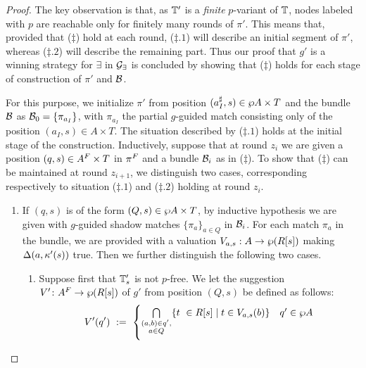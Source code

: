 \begin{proof}
The key observation is that, as $\mathbb{T}'$ is a \emph{finite} $p$-variant of $\mathbb{T}$, nodes labeled with $p$ are reachable only for finitely many rounds of $\pi'$. This means that, provided that ($\ddag$) hold at each round, ($\ddag.1$) will describe an initial segment of $\pi'$, whereas ($\ddag.2$) will describe the remaining part. Thus our proof that $g'$ is a winning strategy for $\exists$ in $\mathcal{G}_{\exists}$ is concluded by showing that ($\ddag$) holds for each stage of construction of $\pi'$ and $\mathcal{B}$.

For this purpose, we initialize $\pi'$ from position $(a_{I}^{\sharp},s) \in \wp A\times T$ and the bundle $\mathcal{B}$ as $\mathcal{B}_0 = \{\pi_{a_I}\}$, with $\pi_{a_I}$ the partial $g$-guided match consisting only of the position $(a_I,s)\in A\times T$. The situation described by ($\ddag .1$) holds at the initial stage of the construction.
Inductively, suppose that at round $z_i$ we are given a position $(q,s) \in A^{F} \times T$ in $\pi^{F}$ and a bundle $\mathcal{B}_i$ as in ($\ddag$). To show that ($\ddag$) can be maintained at round $z_{i+1}$, we distinguish two cases, corresponding respectively to situation ($\ddag.1$) and ($\ddag.2$) holding at round $z_i$.
\begin{enumerate}[label = (\Alph*), ref = \Alph*]
  \item If $(q,s)$ is of the form $(Q,s) \in \wp A \times T$, by inductive hypothesis we are given with $g$-guided shadow matches $\{\pi_a\}_{a \in Q}$ in $\mathcal{B}_i$. For each match $\pi_a$ in the bundle, we are provided with a valuation $V_{a,s}: A \rightarrow \wp (R[s])$ making $\Delta(a,\kappa'(s))$ true. Then we further distinguish the following two cases.
\begin{enumerate}[label = (\roman*), ref = \roman*]
  \item \label{point:TsNotPFree} Suppose first that $\mathbb{T}'_s$ is not $p$-free. We let the suggestion $V' \colon A^{F} \to \wp (R[s])$ of $g'$ from position $(Q,s)$ be defined as follows:
       \begin{align*}
       V'(q')\ :=\ \begin{cases}
               \bigcap\limits_{\substack{(a,b) \in q',\\ a \in Q}}\{t\ \in R[s] \mid t \in V_{a,s}(b)\}               & q' \in \wp A \\[2em]

\end{cases}
\end{align*}
\end{enumerate}
\end{enumerate}
\end{proof}

